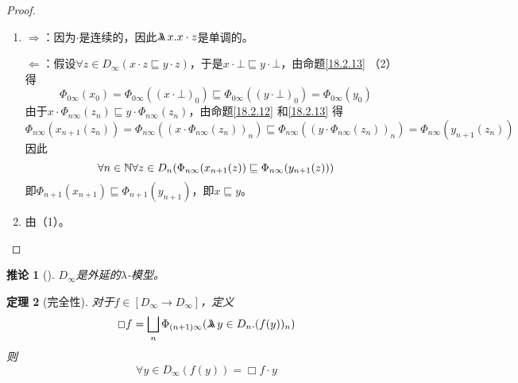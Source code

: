 \documentclass{jams-l}
\newtheorem{theorem}{定理}[section]
\newtheorem{corollary}[theorem]{推论}
\begin{document}
\begin{proof}
\begin{enumerate}
\item \(\Rightarrow\)：因为\(\cdot\)是连续的，因此\(\metalambda x.x\cdot z\)是单调的。

\(\Leftarrow\)：假设\(\forall z\in D_\infty(x\cdot z\sqsubseteq y\cdot z)\)，于是\(x\cdot\bot\sqsubseteq y\cdot\bot\)，由命题\ref{18.2.13} （2）得
\begin{equation*}
\Phi_{0\infty}(x_0)=\Phi_{0\infty}((x\cdot\bot)_0)\sqsubseteq\Phi_{0\infty}((y\cdot\bot)_0)=\Phi_{0\infty}(y_0)
\end{equation*}
由于\(x\cdot\Phi_{n\infty}(z_n)\sqsubseteq y\cdot\Phi_{n\infty}(z_n)\)，由命题\ref{18.2.12} 和\ref{18.2.13} 得
\begin{equation*}
\Phi_{n\infty}(x_{n+1}(z_n))=\Phi_{n\infty}((x\cdot\Phi_{n\infty}(z_n))_n)
\sqsubseteq\Phi_{n\infty}((y\cdot\Phi_{n\infty}(z_n))_n)=\Phi_{n\infty}(y_{n+1}(z_n))
\end{equation*}
因此
\begin{equation*}
\forall n\in\mathbb{N}\forall z\in D_n(\Phi_{n\infty}(x_{n+1}(z))\sqsubseteq\Phi_{n\infty}(y_{n+1}(z)))
\end{equation*}
即\(\Phi_{n+1}(x_{n+1})\sqsubseteq\Phi_{n+1}(y_{n+1})\)，即\(x\sqsubseteq y\)。
\item 由（1）。
\end{enumerate}
\end{proof}

\begin{corollary}[]
\(D_\infty\)是外延的\(\lambda\)-模型。
\end{corollary}

\begin{theorem}[完全性]
\label{18.2.15}
对于\(f\in[D_\infty\to D_\infty]\)，定义
\begin{equation*}
\Box f=\bigsqcup_n\Phi_{(n+1)\infty}(\metalambda y\in D_n.(f(y))_n)
\end{equation*}
则
\begin{equation*}
\forall y\in D_\infty(f(y))=\Box f\cdot y
\end{equation*}
\end{theorem}
\end{document}

